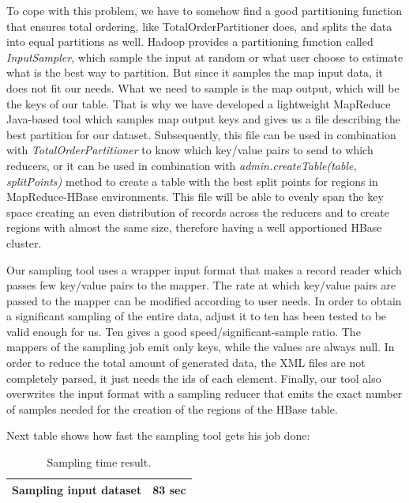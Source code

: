 To cope with this problem, we have to somehow find a good partitioning function that ensures total ordering, like TotalOrderPartitioner does, and splits the data into equal partitions as well. Hadoop provides a partitioning function called \textit{InputSampler}, which sample the input at random or what user choose to estimate what is the best way to partition. But since it samples the map input data, it does not fit our needs. What we need to sample is the map output, which will be the keys of our table. That is why we have developed a lightweight MapReduce Java-based tool which samples map output keys and gives us a file describing the best partition for our dataset. Subsequently, this file can be used in combination with \textit{TotalOrderPartitioner} to know which key/value pairs to send to which reducers, or it can be used in combination with \textit{admin.createTable(table, splitPoints)} method to create a table with the best split points for regions in MapReduce-HBase environments. This file will be able to evenly span the key space creating an even distribution of records across the reducers and to create regions with almost the same size, therefore having a well apportioned HBase cluster.
\par
Our sampling tool uses a wrapper input format that makes a record reader which passes few key/value pairs to the mapper. The rate at which key/value pairs are passed to the mapper can be modified according to user needs. In order to obtain a significant sampling of the entire data, adjust it to ten has been tested to be valid enough for us. Ten gives a good speed/significant-sample ratio. The mappers of the sampling job emit only keys, while the values are always null. In order to reduce the total amount of generated data, the XML files are not completely parsed, it just needs the ids of each element. Finally, our tool also overwrites the input format with a sampling reducer that emits the exact number of samples needed for the creation of the regions of the HBase table. 

\bigskip

Next table shows how fast the sampling tool gets his job done: 

\begin{table}[htbp]
\begin{center}
\begin{tabular}{|l|l|}
\hline
Sampling input dataset & 83 sec \\ \hline
\end{tabular}
\caption{Sampling time result.}
\end{center}
\label{Results}
\end{table}

